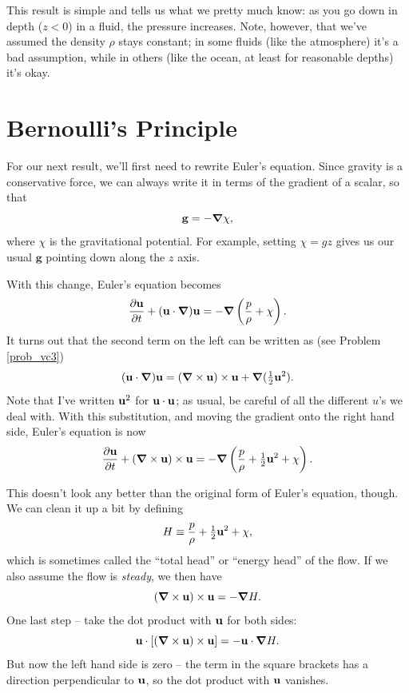 This result is simple and tells us what we pretty much know:  as you go down in depth ($z < 0$) in a fluid, the pressure increases.  Note, however, that we've assumed the density $\rho$ stays constant; in some fluids (like the atmosphere) it's a bad assumption, while in others (like the ocean, at least for reasonable depths) it's okay.






\section{Bernoulli's Principle}

For our next result, we'll first need to rewrite Euler's equation.  Since gravity is a conservative force, we can always write it in terms of the gradient of a scalar, so that
\[
\mathbf{g} = - \boldsymbol{\nabla} \chi,
\]
where $\chi$ is the gravitational potential.  For example, setting $\chi = gz$ gives us our usual $\mathbf{g}$ pointing down along the $z$ axis.

With this change, Euler's equation becomes
\[
\frac{\partial \mathbf{u}}{\partial t} + (\mathbf{u} \cdot \boldsymbol{\nabla}) \mathbf{u} = -\boldsymbol{\nabla} \left( \frac{p}{\rho} + \chi \right).
\]
It turns out that the second term on the left can be written as (see Problem \ref{prob_vc3})
\begin{equation}
 (\mathbf{u} \cdot \boldsymbol{\nabla}) \mathbf{u} = (\boldsymbol{\nabla} \times \mathbf{u} ) \times \mathbf{u} + \boldsymbol{\nabla} (\tfrac{1}{2} \mathbf{u}^2).
\end{equation}
Note that I've written $\mathbf{u}^2$ for $\mathbf{u} \cdot \mathbf{u}$; as usual, be careful of all the different $u$'s we deal with.  With this substitution, and moving the gradient onto the right hand side, Euler's equation is now
\begin{equation}
\frac{\partial \mathbf{u}}{\partial t} + (\boldsymbol{\nabla} \times \mathbf{u} ) \times \mathbf{u} = -\boldsymbol{\nabla} \left( \frac{p}{\rho} + \tfrac{1}{2} \mathbf{u}^2 + \chi \right).
\end{equation}

This doesn't look any better than the original form of Euler's equation, though.  We can clean it up a bit by defining
\[
H \equiv \frac{p}{\rho} + \tfrac{1}{2} \mathbf{u}^2 + \chi,
\]
which is sometimes called the ``total head'' or ``energy head'' of the flow.  If we also assume the flow is \emph{steady}, we then have
\begin{equation}
(\boldsymbol{\nabla} \times \mathbf{u} ) \times \mathbf{u} = -\boldsymbol{\nabla} H.
\label{eq_bernoulli}
\end{equation}
One last step -- take the dot product with $\mathbf{u}$ for both sides:
\[
\mathbf{u} \cdot [(\boldsymbol{\nabla} \times \mathbf{u} ) \times \mathbf{u}] = -\mathbf{u} \cdot \boldsymbol{\nabla} H.
\]
But now the left hand side is zero -- the term in the square brackets has a direction perpendicular to $\mathbf{u}$, so the dot product with $\mathbf{u}$ vanishes.  

